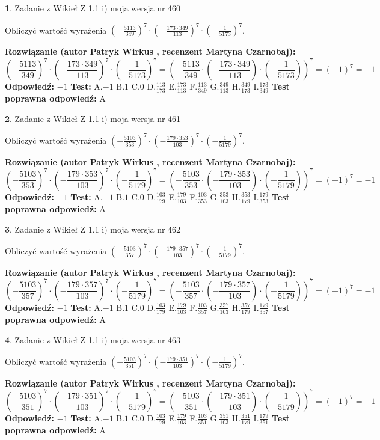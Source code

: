 \documentclass[12pt, a4paper]{article}
\theoremstyle{definition} %
\newtheorem{zad}{}
\newcommand{\zadStart}[1]{\begin{zad}#1\newline}
\newcommand{\zadStop}{\end{zad}}
\newcommand{\rozwStart}[2]{\noindent \textbf{Rozwiązanie (autor #1 , recenzent #2): }\newline}
\newcommand{\rozwStop}{\newline}
\newcommand{\odpStart}{\noindent \textbf{Odpowiedź:}\newline}
\newcommand{\odpStop}{\newline}
\newcommand{\testStart}{\noindent \textbf{Test:}\newline}
\newcommand{\testStop}{\newline}
\newcommand{\kluczStart}{\noindent \textbf{Test poprawna odpowiedź:}\newline}
\newcommand{\kluczStop}{\newline}
\begin{document}
\zadStart{Zadanie z Wikieł Z 1.1 i) moja wersja nr 460}

Obliczyć wartość wyrażenia $(-\frac{5113}{349})^{7} \cdot (-\frac{173 \cdot 349}{113})^{7} \cdot (-\frac{1}{5173})^{7}$.
\zadStop
\rozwStart{Patryk Wirkus}{Martyna Czarnobaj}
$$(-\frac{5113}{349})^{7} \cdot (-\frac{173 \cdot 349}{113})^{7} \cdot (-\frac{1}{5173})^{7} = (-\frac{5113}{349} \cdot (-\frac{173 \cdot 349}{113}) \cdot (-\frac{1}{5173}))^{7} = (-1)^{7} = -1$$
\rozwStop
\odpStart
$-1$
\odpStop
\testStart
A.$-1$ B.$1$ C.$0$ D.$\frac{113}{173}$ E.$\frac{173}{113}$
F.$\frac{113}{349}$ G.$\frac{349}{113}$
H.$\frac{349}{173}$
I.$\frac{173}{349}$
\testStop
\kluczStart
A
\kluczStop



\zadStart{Zadanie z Wikieł Z 1.1 i) moja wersja nr 461}

Obliczyć wartość wyrażenia $(-\frac{5103}{353})^{7} \cdot (-\frac{179 \cdot 353}{103})^{7} \cdot (-\frac{1}{5179})^{7}$.
\zadStop
\rozwStart{Patryk Wirkus}{Martyna Czarnobaj}
$$(-\frac{5103}{353})^{7} \cdot (-\frac{179 \cdot 353}{103})^{7} \cdot (-\frac{1}{5179})^{7} = (-\frac{5103}{353} \cdot (-\frac{179 \cdot 353}{103}) \cdot (-\frac{1}{5179}))^{7} = (-1)^{7} = -1$$
\rozwStop
\odpStart
$-1$
\odpStop
\testStart
A.$-1$ B.$1$ C.$0$ D.$\frac{103}{179}$ E.$\frac{179}{103}$
F.$\frac{103}{353}$ G.$\frac{353}{103}$
H.$\frac{353}{179}$
I.$\frac{179}{353}$
\testStop
\kluczStart
A
\kluczStop



\zadStart{Zadanie z Wikieł Z 1.1 i) moja wersja nr 462}

Obliczyć wartość wyrażenia $(-\frac{5103}{357})^{7} \cdot (-\frac{179 \cdot 357}{103})^{7} \cdot (-\frac{1}{5179})^{7}$.
\zadStop
\rozwStart{Patryk Wirkus}{Martyna Czarnobaj}
$$(-\frac{5103}{357})^{7} \cdot (-\frac{179 \cdot 357}{103})^{7} \cdot (-\frac{1}{5179})^{7} = (-\frac{5103}{357} \cdot (-\frac{179 \cdot 357}{103}) \cdot (-\frac{1}{5179}))^{7} = (-1)^{7} = -1$$
\rozwStop
\odpStart
$-1$
\odpStop
\testStart
A.$-1$ B.$1$ C.$0$ D.$\frac{103}{179}$ E.$\frac{179}{103}$
F.$\frac{103}{357}$ G.$\frac{357}{103}$
H.$\frac{357}{179}$
I.$\frac{179}{357}$
\testStop
\kluczStart
A
\kluczStop



\zadStart{Zadanie z Wikieł Z 1.1 i) moja wersja nr 463}

Obliczyć wartość wyrażenia $(-\frac{5103}{351})^{7} \cdot (-\frac{179 \cdot 351}{103})^{7} \cdot (-\frac{1}{5179})^{7}$.
\zadStop
\rozwStart{Patryk Wirkus}{Martyna Czarnobaj}
$$(-\frac{5103}{351})^{7} \cdot (-\frac{179 \cdot 351}{103})^{7} \cdot (-\frac{1}{5179})^{7} = (-\frac{5103}{351} \cdot (-\frac{179 \cdot 351}{103}) \cdot (-\frac{1}{5179}))^{7} = (-1)^{7} = -1$$
\rozwStop
\odpStart
$-1$
\odpStop
\testStart
A.$-1$ B.$1$ C.$0$ D.$\frac{103}{179}$ E.$\frac{179}{103}$
F.$\frac{103}{351}$ G.$\frac{351}{103}$
H.$\frac{351}{179}$
I.$\frac{179}{351}$
\testStop
\kluczStart
A
\kluczStop
\end{document}
